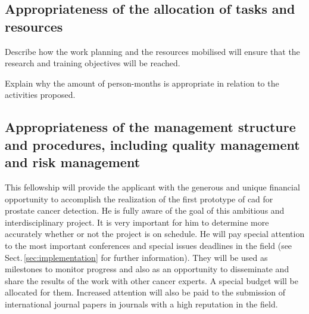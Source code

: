\subsection{Appropriateness of the allocation of tasks and resources}

{\color{red} 
Describe how the work planning and the resources mobilised will ensure that the research and training objectives will be reached.

Explain why the amount of person-months is appropriate in relation to the activities proposed.}

\subsection{Appropriateness of the management structure and procedures, including quality management and risk management}

This fellowship will provide the applicant with the generous and unique financial opportunity to accomplish the realization of the first prototype of \ac{cad} for prostate cancer detection.
He is fully aware of the goal of this ambitious and interdisciplinary project.
It is very important for him to determine more accurately whether or not the project is on schedule. 
He will pay special attention to the most important conferences and special issues deadlines in the field (see Sect.\,\ref{sec:implementation} for further information). 
They will be used as milestones to monitor progress and also as an opportunity to disseminate and share the results of the work with other cancer experts.
A special budget will be allocated for them. 
Increased  attention will also be paid to the submission of international journal papers in journals with a high reputation in the field.

